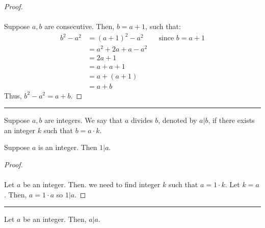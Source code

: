 \documentclass{article}
\def \proofDistance {5pt}
\newcommand{\proofseparator}{\par\noindent\rule{\textwidth}{0.4pt}}
\begin{document}
            \begin{proof}
                \mbox{}\\[-\baselineskip] \\
                Suppose $a,b$ are consecutive. Then, $b = a + 1$, such that:
                \begin{align*}
                    b^2 - a^2 &= (a + 1)^2 - a^2 && \text{since $b = a + 1$} \\
                    &= a^2 + 2a + a - a^2 \\
                    &= 2a + 1 \\
                    &= a + a + 1 \\
                    &= a + (a+1) \\
                    &= a + b
                \end{align*}
                \indent Thus, $b^2 - a^2 = a + b$.
            \end{proof}
        
            \proofseparator

            \begin{definition}
                Suppose $a,b$ are integers. We say that $a$ divides $b$, denoted by $a | b$, if there exists an integer $k$ such that $b = a\cdot k$. 
            \end{definition}

            \vspace{\proofDistance}

            \begin{theorem}
                Suppose $a$ is an integer. Then $1|a$.
            \end{theorem}

            \vspace{\proofDistance}

            \begin{proof}
                \mbox{}\\[-\baselineskip] \\
                Let $a$ be an integer. Then. we need to find integer $k$ such that $a = 1\cdot k$. Let $k = a$. Then, $a = 1\cdot a$  so $1|a$.
            \end{proof}

            \proofseparator

            \begin{theorem}
                Let $a$ be an integer. Then, $a|a$.
            \end{theorem}
\end{document}
